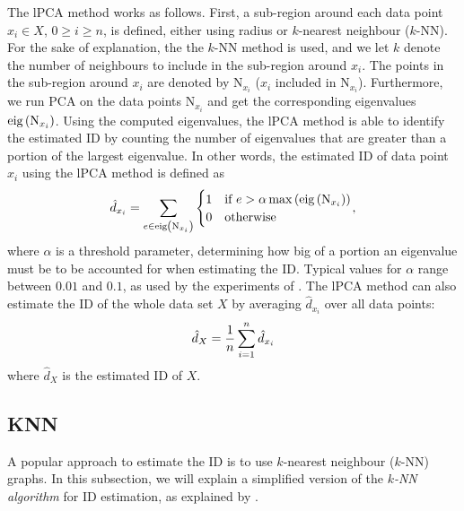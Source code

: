 The lPCA method works as follows. First, a sub-region around each data point $x_i \in X$, $0 \geq i \geq n$, is defined, either using radius or $k$-nearest neighbour ($k$-NN). For the sake of explanation, the the $k$-NN method is used, and we let $k$ denote the number of neighbours to include in the sub-region around $x_i$. The points in the sub-region around $x_i$ are denoted by $\text{N}_{x_i}$ ($x_i$ included in $\text{N}_{x_i}$). Furthermore, we run PCA on the data points $\text{N}_{x_i}$ and get the corresponding eigenvalues $\text{eig}\left(\text{N}_{x_i}\right)$. Using the computed eigenvalues, the lPCA method is able to identify the estimated ID by counting the number of eigenvalues that are greater than a portion of the largest eigenvalue. In other words, the estimated ID of data point $x_i$ using the lPCA method is defined as
\begin{align}
    \hat{d}_{x_i} = \sum\limits_{e \in \text{eig}\left(\text{N}_{x_i}\right)}^{}{
        \begin{cases}
            1 & \mbox{if } e > \alpha \max \left(\text{eig}\left(\text{N}_{x_i}\right)\right) \\
            0 & \mbox{otherwise}
        \end{cases}
    },
    \label{eqn:lpca-esimated-id}
\end{align}
where $\alpha$ is a threshold parameter, determining how big of a portion an eigenvalue must be to be accounted for when estimating the ID. Typical values for $\alpha$ range between $0.01$ and $0.1$, as used by the experiments of \cite{Fukunaga1971}. The lPCA method can also estimate the ID of the whole data set $X$ by averaging $\hat{d}_{x_i}$ over all data points:
\begin{align}
    \hat{d}_{X} = \frac{1}{n} \sum\limits_{i=1}^{n}{\hat{d}_{x_i}}
\end{align}
where $\hat{d}_{X}$ is the estimated ID of $X$.

\subsection{KNN}
A popular approach to estimate the ID is to use $k$-nearest neighbour ($k$-NN) graphs. In this subsection, we will explain a simplified version of the \textit{$k$-NN algorithm} for ID estimation, as explained by \cite[p. 651]{Carter2010}.

